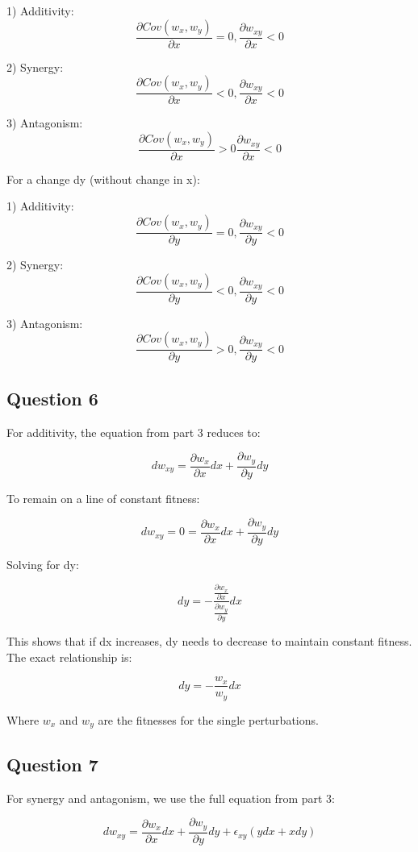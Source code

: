 \documentclass{article}
\begin{document}
1) Additivity: $$\frac{\partial Cov(w_x,w_y)}{\partial x} = 0, \frac{\partial w_{xy}}{\partial x} < 0$$

2) Synergy: $$\frac{\partial Cov(w_x,w_y)}{\partial x} < 0,\frac{\partial w_{xy}}{\partial x} < 0$$

3) Antagonism: $$\frac{\partial Cov(w_x,w_y)}{\partial x} > 0\frac{\partial w_{xy}}{\partial x} < 0$$

For a change dy (without change in x):

1) Additivity: $$\frac{\partial Cov(w_x,w_y)}{\partial y} = 0, \frac{\partial w_{xy}}{\partial y} < 0$$

2) Synergy: $$\frac{\partial Cov(w_x,w_y)}{\partial y} < 0, \frac{\partial w_{xy}}{\partial y} < 0$$

3) Antagonism: $$\frac{\partial Cov(w_x,w_y)}{\partial y} > 0, \frac{\partial w_{xy}}{\partial y} < 0$$

\subsection{Question 6}

For additivity, the equation from part 3 reduces to:

$$dw_{xy} = \frac{\partial w_x}{\partial x} dx + \frac{\partial w_y}{\partial y} dy$$

To remain on a line of constant fitness:

$$dw_{xy} = 0 = \frac{\partial w_x}{\partial x} dx + \frac{\partial w_y}{\partial y} dy$$

Solving for dy:

$$dy = -\frac{\frac{\partial w_x}{\partial x}}{\frac{\partial w_y}{\partial y}} dx$$

This shows that if dx increases, dy needs to decrease to maintain constant fitness. The exact relationship is:

$$dy = -\frac{w_x}{w_y} dx$$

Where $w_x$ and $w_y$ are the fitnesses for the single perturbations.

\subsection{Question 7}

For synergy and antagonism, we use the full equation from part 3:

$$dw_{xy} = \frac{\partial w_x}{\partial x} dx + \frac{\partial w_y}{\partial y} dy + \epsilon_{xy} (y dx + x dy)$$
\end{document}

